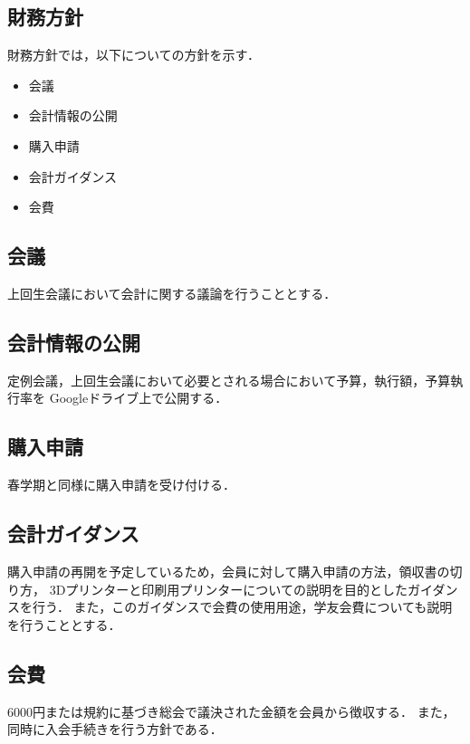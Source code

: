\subsection*{財務方針}



財務方針では，以下についての方針を示す．
\begin{itemize}
  \item 会議
  \item 会計情報の公開
  \item 購入申請
  \item 会計ガイダンス
  \item 会費
\end{itemize}

\subsection*{会議}
上回生会議において会計に関する議論を行うこととする．

\subsection*{会計情報の公開}
定例会議，上回生会議において必要とされる場合において予算，執行額，予算執行率を
Googleドライブ上で公開する．

\subsection*{購入申請}
春学期と同様に購入申請を受け付ける．

\subsection*{会計ガイダンス}
購入申請の再開を予定しているため，会員に対して購入申請の方法，領収書の切り方，
3Dプリンターと印刷用プリンターについての説明を目的としたガイダンスを行う．
また，このガイダンスで会費の使用用途，学友会費についても説明を行うこととする．

\subsection*{会費}
6000円または規約に基づき総会で議決された金額を会員から徴収する．
また，同時に入会手続きを行う方針である．
